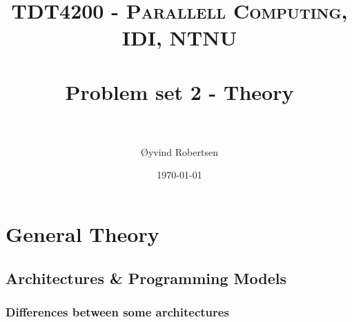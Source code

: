 \documentclass[paper=a4, fontsize=11pt]{scrartcl} %
\title{	
\normalfont \normalsize 
\textsc{TDT4200 - Parallell Computing, IDI, NTNU} \\ [25pt] %
\horrule{0.5pt} \\[0.4cm] %
\huge Problem set 2 - Theory \\ %
\horrule{2pt} \\[0.5cm] %
}
\author{Øyvind Robertsen} %
\date{\normalsize\today} %
\numberwithin{equation}{section} %
\numberwithin{figure}{section} %
\numberwithin{table}{section} %
\begin{document}
\maketitle %


\section{General Theory}

\subsection{Architectures \& Programming Models}

\subsubsection{Differences between some architectures}
\end{document}
